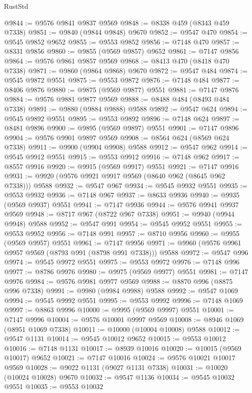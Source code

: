 \begin{lexlean}{RustStd}
\begin{coremodule}
@9844 := @9576 @9841 @9837 @9569
@9848 := @8338 @459 (@8343 @459 @7338)
@9851 := @9840 (@9844 @9848) @9670
@9852 := @9547 @470
@9854 := @9545 @9852 @9652
@9855 := @9553 @9852
@9856 := @7148 @470
@9857 := @8331 @9856
@9860 := @9855 (@9569 @9857) @9652
@9861 := @7147 @9856
@9864 := @9576 @9861 @9857 @9569
@9868 := @8413 @470 (@8418 @470 @7338)
@9871 := @9860 (@9864 @9868) @9670
@9872 := @9547 @484
@9874 := @9545 @9872 @9551
@9875 := @9553 @9872
@9876 := @7148 @484
@9877 := @8406 @9876
@9880 := @9875 (@9569 @9877) @9551
@9881 := @7147 @9876
@9884 := @9576 @9881 @9877 @9569
@9888 := @8488 @484 (@8493 @484 @7338)
@9891 := @9880 (@9884 @9888) @9588
@9892 := @9547 @624
@9894 := @9545 @9892 @9551
@9895 := @9553 @9892
@9896 := @7148 @624
@9897 := @8481 @9896
@9900 := @9895 (@9569 @9897) @9551
@9901 := @7147 @9896
@9904 := @9576 @9901 @9897 @9569
@9908 := @8564 @624 (@8569 @624 @7338)
@9911 := @9900 (@9904 @9908) @9588
@9912 := @9547 @962
@9914 := @9545 @9912 @9551
@9915 := @9553 @9912
@9916 := @7148 @962
@9917 := @8557 @9916
@9920 := @9915 (@9569 @9917) @9551
@9921 := @7147 @9916
@9931 := @9920 (@9576 @9921 @9917 @9569 (@8640 @962 (@8645 @962 @7338))) @9588
@9932 := @9547 @967
@9934 := @9545 @9932 @9551
@9935 := @9553 @9932
@9936 := @7148 @967
@9937 := @8633 @9936
@9940 := @9935 (@9569 @9937) @9551
@9941 := @7147 @9936
@9944 := @9576 @9941 @9937 @9569
@9948 := @8717 @967 (@8722 @967 @7338)
@9951 := @9940 (@9944 @9948) @9588
@9952 := @9547 @991
@9954 := @9545 @9952 @9551
@9955 := @9553 @9952
@9956 := @7148 @991
@9957 := @8710 @9956
@9960 := @9955 (@9569 @9957) @9551
@9961 := @7147 @9956
@9971 := @9960 (@9576 @9961 @9957 @9569 (@8793 @991 (@8798 @991 @7338))) @9588
@9972 := @9547 @996
@9974 := @9545 @9972 @9551
@9975 := @9553 @9972
@9976 := @7148 @996
@9977 := @8786 @9976
@9980 := @9975 (@9569 @9977) @9551
@9981 := @7147 @9976
@9984 := @9576 @9981 @9977 @9569
@9988 := @8870 @996 (@8875 @996 @7338)
@9991 := @9980 (@9984 @9988) @9588
@9992 := @9547 @1069
@9994 := @9545 @9992 @9551
@9995 := @9553 @9992
@9996 := @7148 @1069
@9997 := @8863 @9996
@10000 := @9995 (@9569 @9997) @9551
@10001 := @7147 @9996
@10004 := @9576 @10001 @9997 @9569
@10008 := @8946 @1069 (@8951 @1069 @7338)
@10011 := @10000 (@10004 @10008) @9588
@10012 := @9547 @1131
@10014 := @9545 @10012 @9652
@10015 := @9553 @10012
@10016 := @7148 @1131
@10017 := @8939 @10016
@10020 := @10015 (@9569 @10017) @9652
@10021 := @7147 @10016
@10024 := @9576 @10021 @10017 @9569
@10028 := @9022 @1131 (@9027 @1131 @7338)
@10031 := @10020 (@10024 @10028) @9670
@10032 := @9547 @1136
@10034 := @9545 @10032 @9551
@10035 := @9553 @10032

\end{coremodule}
\end{lexlean}
